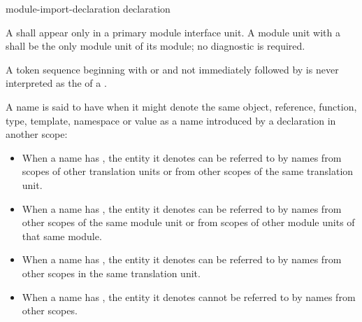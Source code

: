 \begin{bnf}
\br
    module-import-declaration\br
    declaration
\end{bnf}

\pnum
A  shall appear only
in a primary module interface unit.
A module unit with a 
shall be the only module unit of its module;
no diagnostic is required.

\pnum
A token sequence beginning with
  or
 
and not immediately followed by \tcode{::}
is never interpreted as the 
of a .

\pnum
{}%
%
%
%
A name is said to have  when it might denote the same
object, reference, function, type, template, namespace or value as a
name introduced by a declaration in another scope:
\begin{itemize}
\item When a name has ,
the entity it denotes
can be referred to by names from scopes of other translation units or
from other scopes of the same translation unit.

\item When a name has ,
the entity it denotes
can be referred to by names from other scopes of the same module unit or
from scopes of other module units of that same module.

\item When a name has ,
the entity it denotes
can be referred to by names from other scopes in the same translation
unit.

\item When a name has , the entity it denotes
cannot be referred to by names from other scopes.
\end{itemize}

